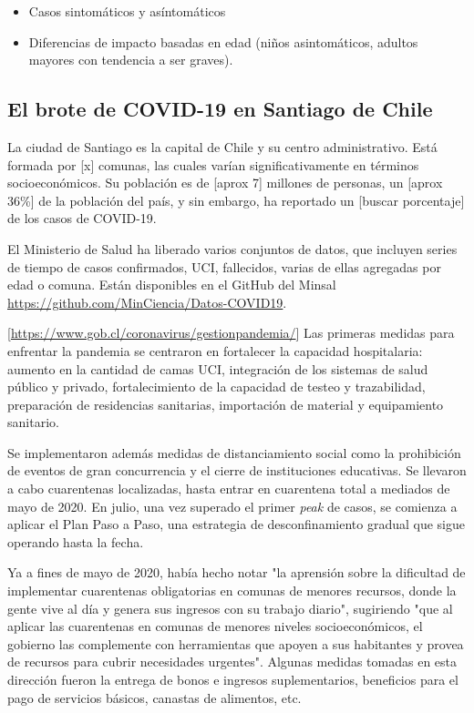 \begin{itemize}

\item Casos sintomáticos y asíntomáticos 
\item Diferencias de impacto basadas en edad (niños asintomáticos, adultos mayores con tendencia a ser graves).

\end{itemize}


\subsection{El brote de COVID-19 en Santiago de Chile }

La ciudad de Santiago es la capital de Chile y su centro administrativo. Está formada por [x] comunas, las cuales varían significativamente en términos socioeconómicos. Su población es de [aprox 7] millones de personas, un [aprox 36\%] de la población del país, y sin embargo, ha reportado un [buscar porcentaje] de los casos de COVID-19.

El Ministerio de Salud ha liberado varios conjuntos de datos, que incluyen series de tiempo de casos confirmados, UCI, fallecidos, varias de ellas agregadas por edad o comuna. Están disponibles en el GitHub del Minsal \url{https://github.com/MinCiencia/Datos-COVID19}.



[\url{https://www.gob.cl/coronavirus/gestionpandemia/}]
Las primeras medidas para enfrentar la pandemia se centraron en fortalecer la capacidad hospitalaria: aumento en la cantidad de camas UCI, integración de los sistemas de salud público y privado, fortalecimiento de la capacidad de testeo y trazabilidad, preparación de residencias sanitarias, importación de material y equipamiento sanitario.

Se implementaron además medidas de distanciamiento social como la prohibición de eventos de gran concurrencia y el cierre de instituciones educativas. Se llevaron a cabo cuarentenas localizadas, hasta entrar en cuarentena total a mediados de mayo de 2020. En julio, una vez superado el primer \textit{peak} de casos, se comienza a aplicar el Plan Paso a Paso, una estrategia de desconfinamiento  gradual que sigue operando hasta la fecha.

Ya a fines de mayo de 2020, \cite{Olivares2020} había hecho notar "la aprensión sobre la dificultad de implementar cuarentenas obligatorias en comunas de menores recursos, donde la gente vive al día y genera sus ingresos con su trabajo diario", sugiriendo "que al aplicar las cuarentenas en comunas de menores niveles socioeconómicos, el gobierno las complemente con herramientas que apoyen a sus habitantes y provea de recursos para cubrir necesidades urgentes". Algunas medidas tomadas en esta dirección fueron la entrega de bonos e ingresos suplementarios, beneficios para el pago de servicios básicos, canastas de alimentos, etc.

